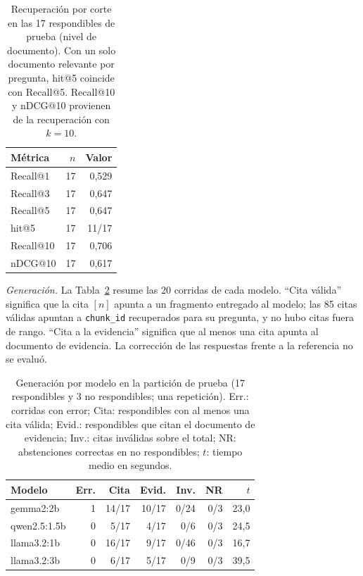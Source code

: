 \documentclass[conference]{IEEEtran}
\begin{document}
\begin{table}[ht]
\centering
\caption{Recuperación por corte en las 17 respondibles de prueba (nivel de documento). Con un solo documento relevante por pregunta, hit@5 coincide con Recall@5. Recall@10 y nDCG@10 provienen de la recuperación con $k=10$.}
\label{tab:recuperacion_k}
\begin{tabular}{lrr}
\toprule
Métrica & $n$ & Valor \\
\midrule
Recall@1 & 17 & 0,529 \\
Recall@3 & 17 & 0,647 \\
Recall@5 & 17 & 0,647 \\
hit@5 & 17 & 11/17 \\
Recall@10 & 17 & 0,706 \\
nDCG@10 & 17 & 0,617 \\
\bottomrule
\end{tabular}
\end{table}

\textit{Generación.} La Tabla~\ref{tab:generacion} resume las 20 corridas de cada modelo. ``Cita válida'' significa que la cita $[n]$ apunta a un fragmento entregado al modelo; las 85 citas válidas apuntan a \texttt{chunk\_id} recuperados para su pregunta, y no hubo citas fuera de rango. ``Cita a la evidencia'' significa que al menos una cita apunta al documento de evidencia. La corrección de las respuestas frente a la referencia no se evaluó.

\begin{table}[ht]
\centering
\caption{Generación por modelo en la partición de prueba (17 respondibles y 3 no respondibles; una repetición). Err.: corridas con error; Cita: respondibles con al menos una cita válida; Evid.: respondibles que citan el documento de evidencia; Inv.: citas inválidas sobre el total; NR: abstenciones correctas en no respondibles; $t$: tiempo medio en segundos.}
\label{tab:generacion}
\setlength{\tabcolsep}{3pt}
\small
\begin{tabular}{lrrrrrr}
\toprule
Modelo & Err. & Cita & Evid. & Inv. & NR & $t$ \\
\midrule
gemma2:2b & 1 & 14/17 & 10/17 & 0/24 & 0/3 & 23,0 \\
qwen2.5:1.5b & 0 & 5/17 & 4/17 & 0/6 & 0/3 & 24,5 \\
llama3.2:1b & 0 & 16/17 & 9/17 & 0/46 & 0/3 & 16,7 \\
llama3.2:3b & 0 & 6/17 & 5/17 & 0/9 & 0/3 & 39,5 \\
\bottomrule
\end{tabular}
\end{table}
\end{document}
